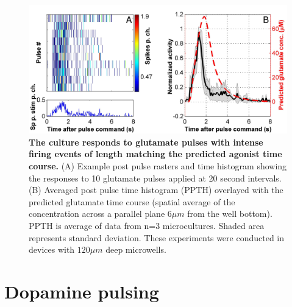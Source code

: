     \begin{figure}[h]
       \centering
       \includegraphics[width=15cm]{chapter6/figures/glutamatePulses/GlutamatePulsingAvg.jpg}
       \caption[Microculture electrical responses to glutamate pulses]{\textbf{The culture responds to glutamate pulses with intense firing events of length matching the predicted agonist time course.} (A) Example post pulse rasters and time histogram showing the responses to 10 glutamate pulses applied at 20 second intervals. (B) Averaged post pulse time histogram (PPTH) overlayed with the predicted glutamate time course (spatial average of the concentration across a parallel plane \(6\mu m\) from the well bottom). PPTH is average of data from n=3 microcultures. Shaded area represents standard deviation. These experiments were conducted in devices with \(120\mu m\) deep microwells.}
       \label{fig:pulses:glutamatePulses}

   \end{figure}


\section{Dopamine pulsing}
\label{sec:pulsing:dopamine}


